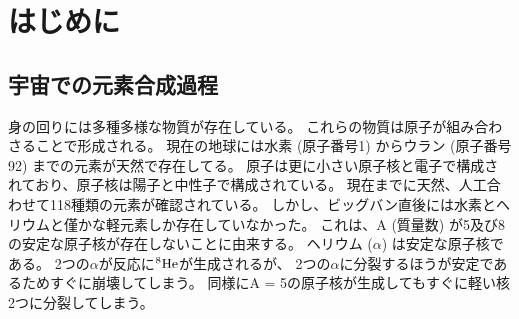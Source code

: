 \chapter{はじめに}
\section{宇宙での元素合成過程}
\label{seq::nucleaosynthesis}
身の回りには多種多様な物質が存在している。
これらの物質は原子が組み合わさることで形成される。
現在の地球には水素 (原子番号1) からウラン (原子番号92) までの元素が天然で存在してる。
原子は更に小さい原子核と電子で構成されており、原子核は陽子と中性子で構成されている。
現在までに天然、人工合わせて118種類の元素が確認されている。
しかし、ビッグバン直後には水素とヘリウムと僅かな軽元素しか存在していなかった。
これは、A (質量数) が5及び8の安定な原子核が存在しないことに由来する。
ヘリウム ($\alpha$) は安定な原子核である。
2つの$\alpha$が反応に${}^{8}\rm{He}$が生成されるが、
2つの$\alpha$に分裂するほうが安定であるためすぐに崩壊してしまう。
同様にA = 5の原子核が生成してもすぐに軽い核2つに分裂してしまう。

